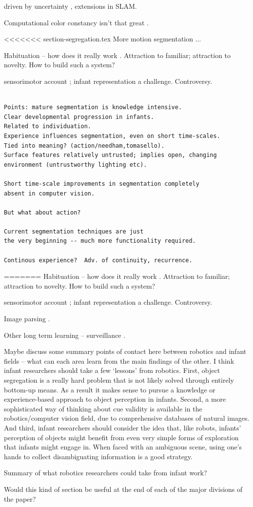 driven by uncertainty \cite{whaite97autonomous}, 
extensions in SLAM.

Computational color constancy isn't that great
\cite{barnard02comparison}.

<<<<<<< section-segregation.tex
More motion segmentation \cite{smith04layered}...

Habituation -- how does it really work \cite{sirois02models}.
Attraction to familiar; attraction to novelty.
How to build such a system?

sensorimotor account \cite{oregan01sensorimotor};
infant representation a challenge.  Controversy.



\begin{verbatim}

Points: mature segmentation is knowledge intensive.
Clear developmental progression in infants.
Related to individuation.
Experience influences segmentation, even on short time-scales.
Tied into meaning? (action/needham,tomasello).
Surface features relatively untrusted; implies open, changing 
environment (untrustworthy lighting etc).

Short time-scale improvements in segmentation completely
absent in computer vision.

But what about action?

Current segmentation techniques are just
the very beginning -- much more functionality required.

Continous experience?  Adv. of continuity, recurrence.

\end{verbatim}


=======
Habituation -- how does it really work \cite{sirois02models}.
Attraction to familiar; attraction to novelty.
How to build such a system?

sensorimotor account \cite{oregan01sensorimotor};
infant representation a challenge.  Controversy.

Image parsing \cite{tu05image}.

Other long term learning -- surveillance \cite{stauffer00learning}.

Maybe discuss some summary points of contact here between robotics and
infant fields -- what can each area learn from the main findings
of the other.  I think infant researchers should take a few
`lessons' from robotics.  First, object segregation is
a really hard problem that is not likely solved through entirely
bottom-up means.  As a result it makes sense to pursue a knowledge or
experience-based approach to object perception in infants.  Second, a
more sophisticated way of thinking about cue validity is available in
the robotics/computer vision field, due to comprehensive databases of
natural images.  And third, infant researchers should consider the
idea that, like robots, infants' perception of objects might
benefit from even very simple forms of exploration that infants might
engage in.  When faced with an ambiguous scene, using one's
hands to collect disambiguating information is a good strategy.


Summary of what robotics researchers could take from infant work?



Would this kind of section be useful at the end of each of the major
divisions of the paper?

